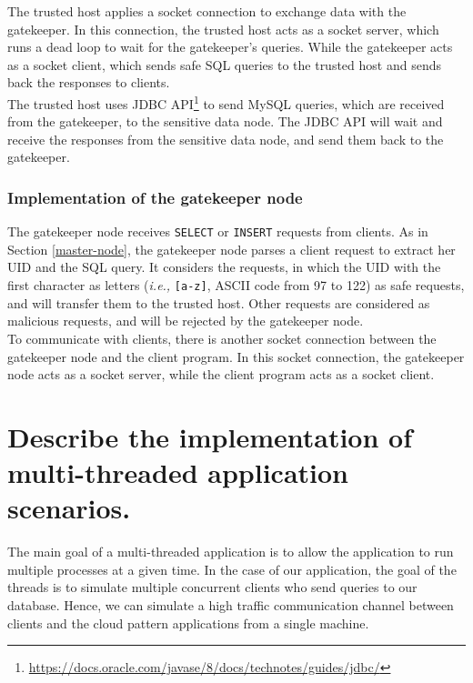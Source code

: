 \documentclass{article}
\begin{document}
The trusted host applies a socket connection to exchange data with the gatekeeper. In this connection, the trusted host acts as a socket server, which runs a dead loop to wait for the gatekeeper's queries. While the gatekeeper acts as a socket client, which sends safe SQL queries to the trusted host and sends back the responses to clients.\\

The trusted host uses JDBC API\footnote{\url{https://docs.oracle.com/javase/8/docs/technotes/guides/jdbc/}} to send MySQL queries, which are received from the gatekeeper, to the sensitive data node. The JDBC API will wait and receive the responses from the sensitive data node, and send them back to the gatekeeper.

\subsubsection{Implementation of the gatekeeper node}
The gatekeeper node receives \texttt{SELECT} or \texttt{INSERT} requests from clients. As in Section \ref{master-node}, the gatekeeper node parses a client request to extract her UID and the SQL query. It considers the requests, in which the UID with the first character as letters (\emph{i.e.,} \texttt{[a-z]}, ASCII code from 97 to 122) as safe requests, and will transfer them to the trusted host. Other requests are considered as malicious requests, and will be rejected by the gatekeeper node. \\

To communicate with clients, there is another socket connection between the gatekeeper node and the client program. In this socket connection, the gatekeeper node acts as a socket server, while the client program acts as a socket client.


\section{Describe the implementation of multi-threaded application scenarios.}\label{Q4}

The main goal of a multi-threaded application is to allow the application to run multiple processes at a given time.  In the case of our application, the goal of the threads is to simulate multiple concurrent clients who send queries to our database. Hence, we can simulate a high traffic communication channel between clients and the cloud pattern applications from a single machine. \\
\end{document}
